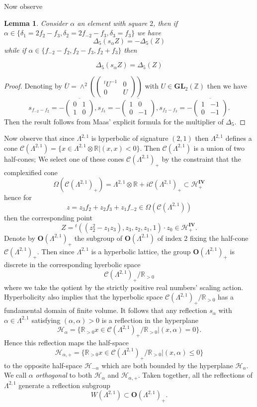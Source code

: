 \documentclass[9pt]{amsart} \usepackage[utf8]{inputenc}
\newtheorem{lemma}{Lemma}
\newcommand{\Z}{\mathbb{Z}} \newcommand{\C}{\mathbb{C}}
\newcommand{\R}{\mathbb{R}} \newcommand{\La}{\Lambda}
\newcommand{\GL}{\mathbf{GL}}
\newcommand{\Orth}{\mathbf{O}}
\newcommand{\Hpl}{\mathcal{H}}
\newcommand{\IV}{\mathbf{IV}}
\newcommand{\Cone}{\mathcal{C}}
\begin{document}
Now observe
\begin{lemma}
Consider $\alpha$ an element with square $2$, then if $\alpha \in
\{\delta_1 = 2f_2 -f_3, \delta_2 = 2f_{-2} - f_3, \delta_3 = f_3\}$ we
have
$$\Delta_5(s_{\alpha}Z) = - \Delta_5(Z)$$
while if $\alpha \in \{f_{-2} - f_2, f_2 - f_3, f_2 + f_3\}$ then

$$\Delta_5(s_{\alpha}Z) = \Delta_5(Z)$$
\end{lemma}
\begin{proof}
Denoting by $\overline{U} = \wedge^2(\begin{pmatrix}{}^tU^{-1} & 0\\ 0 &
U\end{pmatrix})$ with $U \in
\GL_2(\Z)$ then we have $$s_{f_{-2} - f_2} = -\overline{\begin{pmatrix}0
& 1\\ 1 &0\end{pmatrix}}, s_{f_3} = - \overline{\begin{pmatrix}1& 0\\  0
&-1\end{pmatrix}}, s_{f_2 - f_3} =
-\overline{\begin{pmatrix}1 & -1\\ 0 & -1\end{pmatrix}}.$$ Then the result follows from Maas' explicit
formula for the multiplier of $\Delta_5.$
\end{proof}

Now observe that since $\La^{2,1}$ is hyperbolic of signature $(2,1)$
then $\La^{2,1}$ defines a cone $\Cone(\La^{2,1}) = \{ x \in \La^{2,1}
\otimes \R | (x,x) < 0\}$. Then $\Cone(\La^{2,1})$ is a union of two
half-cones; We select one of these cones $\Cone(\La^{2,1})_+$ by the
constraint that the complexified cone $$\Omega(\Cone(\La^{2,1})_+) = \La^{2,1} \otimes \R
+i\Cone(\La^{2,1})_+ \subset \Hpl^{\IV}_+$$ hence for $$z = z_3 f_2 + z_2
f_3 + z_1 f_{-2} \in \Omega(\Cone(\La^{2,1}))$$ then the corresponding
point $$Z = {}^t ((z_2^2 - z_1z_3), z_3, z_2, z_1, 1) \cdot z_0 \in
\Hpl^{\IV}_+.$$ Denote by $\Orth(\La^{2,1})_+$ the subgroup of
$\Orth(\La^{2,1})$ of index 2 fixing the half-cone
$\Cone(\Lambda^{2,1})_+$. Then since $\La^{2,1}$ is a hyperbolic
lattice, the group $\Orth(\La^{2,1})_+$ is discrete in the corresponding
hyerbolic space $$\Cone(\La^{2,1})_+ / \R_{>0}$$ where we take the
qotient by the strictly positive real numbers' scaling action.
Hyperbolicity also implies that the hyperbolic space
$\Cone(\La^{2,1})_+ / \R_{>0}$ has a fundamental domain of finite
volume. It follows that any reflection $s_{\alpha}$ with $\alpha \in
\La^{2,1}$ satisfying $(\alpha,\alpha) > 0$ is a reflection in the
hyperplane $$\Hpl_{\alpha} = \{ \R_{>0}x \in \Cone(\La^{2,1})_+/\R_{>0} |
(x,\alpha) = 0\}.$$ Hence this reflection maps the half-space
$$\Hpl_{\alpha,+} = \{\R_{>0} x \in \Cone(\La^{2,1})_+/\R_{>0} |
(x,\alpha) \leq  0\}$$ to the opposite half-space $\Hpl_{-\alpha}$ which
are both bounded by the hyperplane $\Hpl_{\alpha}$. We call $\alpha$
\textit{orthogonal} to both $\Hpl_{\alpha}$ and $\Hpl_{\alpha,+}$. Taken
together, all the reflections of $\Lambda^{2,1}$ generate a reflection
subgroup $$W(\La^{2,1}) \subset \Orth(\La^{2,1})_+.$$
\end{document}
